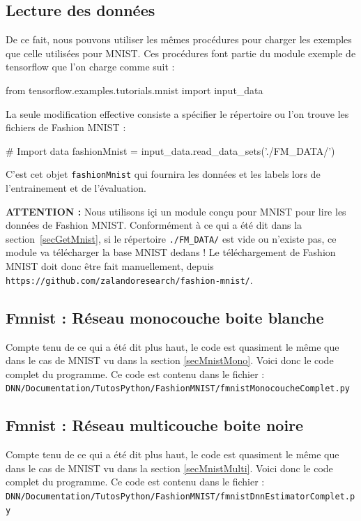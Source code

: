 \documentclass[a4paper,11pt]{book}
\begin{document}
\subsection{Lecture des données}
\label{secGetFmnist}

De ce fait, nous pouvons utiliser les mêmes procédures pour charger les exemples que celle utilisées pour MNIST. Ces procédures font partie du module exemple de tensorflow que l'on charge comme suit :
\begin{mypython}
from tensorflow.examples.tutorials.mnist import input_data
\end{mypython}
La seule modification effective consiste a spécifier le répertoire ou l'on trouve les fichiers de Fashion MNIST :
\begin{mypython}
# Import data
fashionMnist = input_data.read_data_sets('./FM_DATA/')
\end{mypython}
C'est cet objet \verb+fashionMnist+ qui fournira les données et les labels lors de l'entrainement et de l'évaluation.

\textbf{ATTENTION :} Nous utilisons içi un module conçu pour MNIST pour lire les données de Fashion MNIST. Conformément à ce qui a été dit dans la section~\ref{secGetMnist}, si le répertoire \verb+./FM_DATA/+ est vide ou n'existe pas, ce module va télécharger la base MNIST dedans !
Le téléchargement de Fashion MNIST doit donc être fait manuellement, depuis\\
\verb+https://github.com/zalandoresearch/fashion-mnist/+.

\subsection{Fmnist : Réseau monocouche boite blanche}
\label{secFashionMnistMono}
Compte tenu de ce qui a été dit plus haut, le code est quasiment le même que dans le cas de MNIST vu dans la section \ref{secMnistMono}. 
Voici donc le code complet du programme. Ce code est contenu dans le fichier :\\
\verb+DNN/Documentation/TutosPython/FashionMNIST/fmnistMonocoucheComplet.py+



\subsection{Fmnist : Réseau multicouche boite noire}
\label{secFashionMnistMulti}
Compte tenu de ce qui a été dit plus haut, le code est quasiment le même que dans le cas de MNIST vu dans la section \ref{secMnistMulti}. 
Voici donc le code complet du programme. Ce code est contenu dans le fichier :\\
\verb+DNN/Documentation/TutosPython/FashionMNIST/fmnistDnnEstimatorComplet.py+
\end{document}
